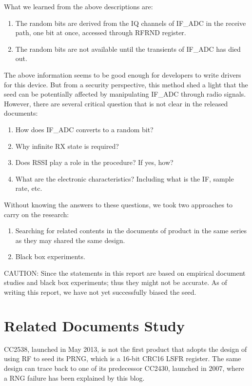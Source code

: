 What we learned from the above descriptions are:
\begin{enumerate}
\item The random bits are derived from the IQ channels of IF\_ADC in the receive path, one bit at once, accessed through RFRND register.
\item The random bits are not available until the transients of IF\_ADC has died out.
\end{enumerate}

The above information seems to be good enough for developers to write drivers for this device. But from a security perspective, this method shed a light that the seed can be potentially affected by manipulating IF\_ADC through radio signals. However, there are several critical question that is not clear in the released documents:
\begin{enumerate}
\item How does IF\_ADC converts to a random bit?
\item Why infinite RX state is required?
\item Does RSSI play a role in the procedure? If yes, how?
\item What are the electronic characteristics? Including what is the IF, sample rate, etc.
\end{enumerate}

Without knowing the answers to these questions, we took two approaches to carry on the research:
\begin{enumerate}
\item Searching for related contents in the documents of product in the same series as they may shared the same design.
\item Black box experiments.
\end{enumerate}

CAUTION: Since the statements in this report are based on empirical document studies and black box experiments; thus they might not be accurate. As of writing this report, we have not yet successfully biased the seed.

\section{Related Documents Study}

CC2538, launched in May 2013, is not the first product that adopts the design of using RF to seed its PRNG, which is a 16-bit CRC16 LSFR register. The same design can trace back to one of its predecessor CC2430\cite{CC2430_Manual}, launched in 2007,  where a RNG failure has been explained by this blog\cite{CC2430Fail}.

